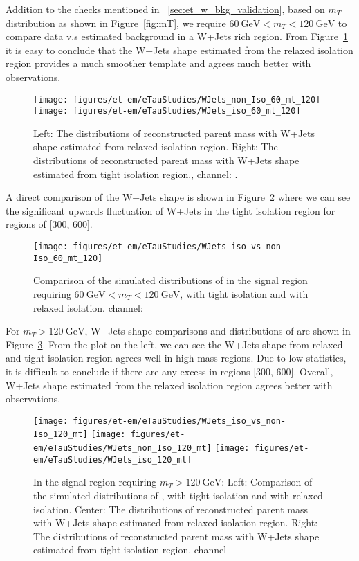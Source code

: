 Addition to the checks mentioned in ~\ref{sec:et_w_bkg_validation}, based on $m_T$ 
distribution as shown in Figure~\ref{fig:mT}, we require $60~\text{GeV} < m_T < 120~\text{GeV}$
to compare data v.s estimated background in a W+Jets rich region. From 
Figure~\ref{fig:60_mT_120} it is easy to conclude that the W+Jets shape 
estimated from the relaxed \tauh isolation region provides a much
smoother template and agrees much better with observations.

\begin{figure}\centering
  \texttt{[image: figures/et-em/eTauStudies/WJets\_non\_Iso\_60\_mt\_120]}
  \texttt{[image: figures/et-em/eTauStudies/WJets\_iso\_60\_mt\_120]}
  \caption{\label{fig:60_mT_120} Left: The distributions of
    reconstructed parent mass with W+Jets shape estimated from
    relaxed \tauh isolation region. Right: The distributions of
    reconstructed parent mass with W+Jets shape estimated from
    tight \tauh isolation region., \teth channel:
    \meffetau.}
\end{figure}

A direct comparison of the W+Jets shape is shown in Figure~\ref{fig:WJets_60_mT_120}
where we can see the significant upwards fluctuation of W+Jets in the tight \tauh 
isolation region for \meffetau regions of [300, 600].

\begin{figure}\centering
  \texttt{[image: figures/et-em/eTauStudies/WJets\_iso\_vs\_non-Iso\_60\_mt\_120]}
  \caption{\label{fig:WJets_60_mT_120} Comparison of the simulated
    distributions of \meffetau in the signal region requiring 
    $60~\text{GeV} < m_T < 120~\text{GeV}$, with tight \tauh
    isolation and with relaxed \tauh isolation.
    \teth channel:\meffetau}
\end{figure}

For $m_T > 120~\text{GeV}$, W+Jets shape comparisons and distributions of \meffetau are shown
in Figure~\ref{fig:120_mT}. From the plot on the left, we can see the W+Jets shape from relaxed 
and tight \tauh isolation region agrees well in high mass regions. Due to low statistics, it 
is difficult to conclude if there are any excess in \meffetau regions [300, 600]. Overall, 
W+Jets shape estimated from the relaxed \tauh isolation region agrees better with observations.

\begin{figure}\centering
  \texttt{[image: figures/et-em/eTauStudies/WJets\_iso\_vs\_non-Iso\_120\_mt]}
  \texttt{[image: figures/et-em/eTauStudies/WJets\_non\_Iso\_120\_mt]}
  \texttt{[image: figures/et-em/eTauStudies/WJets\_iso\_120\_mt]}
  \caption{\label{fig:120_mT} In the signal region requiring 
    $m_T > 120~\text{GeV}$: Left: Comparison of the simulated
    distributions of \meffetau, with tight \tauh isolation and 
    with relaxed \tauh isolation. Center: The distributions of
    reconstructed parent mass with W+Jets shape estimated from
    relaxed \tauh isolation region. Right: The distributions of
    reconstructed parent mass with W+Jets shape estimated from
    tight \tauh isolation region. \teth channel}
\end{figure}

